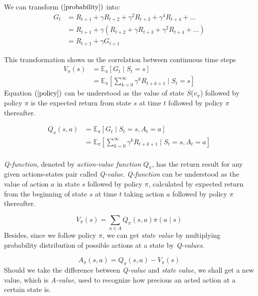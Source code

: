 \documentclass{article}
\begin{document}
We can transform $(\ref{probability})$ into:
\begin{align} 
G_t &= R_{t+1} + \gamma R_{t + 2}  + \gamma^2 R_{t + 3} + \gamma^4 R_{t + 4} + ...  \nonumber \\
    &= R_{t + 1} + \gamma (R_{t + 2} + \gamma R_{t + 3} + \gamma^2 R_{t + 4} + ...) \nonumber \\
    &= R_{t + 1} + \gamma G_{t + 1} \nonumber 
\end{align}

This transformation shows us the correlation between continuous time steps
\begin{align}
\label{policy}
V_{\pi}(s)  &= \mathbb{E}_{\pi}\left[G_{t} \mid S_{t} = s\right] \nonumber \\
            &= \mathbb{E}_{\pi}\left[\sum_{k = 0}^{\infty} \gamma^k R_{t+k+1} \mid S_t = s\right]
\end{align}
Equation $(\ref{policy})$ can be understood as the value of state $S$($v_\pi$) followed by policy $\pi$ is the expected return from state $s$ at time $t$ followed by policy $\pi$ thereafter.

\begin{align}
Q_{\pi}(s, a)   &= \mathbb{E}_{\pi}\left[G_t \mid S_t = s, A_t = a \right] \nonumber \\
                &= \mathbb{E}_{\pi}\left[\sum_{k = 0}^{\infty} \gamma^k R_{t+k+1} \mid S_t = s, A_t = a\right]
\end{align}
\\
\textit{Q-function}, denoted by \textit{action-value function} $Q_{\pi}$, has the return result for any given actions-states pair called \textit{Q-value}. \textit{Q-function} can be understood as the value of action $a$ in state $s$ followed by policy $\pi$, calculated by expected return from the beginning of state $s$ at time $t$ taking action $a$ followed by policy $\pi$ thereafter.

\begin{equation}
    V_{\pi}(s) = \sum_{a \in A} Q_{\pi}(s, a)\pi(a \mid s) \nonumber 
\end{equation}
Besides, since we follow policy $\pi$, we can get \textit{state value} by multiplying probability distribution of possible actions at a state by \textit{Q-values}.

\begin{equation}
    A_{\pi}(s, a) = Q_{\pi}(s, a) - V_{\pi}(s) \nonumber
\end{equation}
Should we take the difference between \textit{Q-value} and \textit{state value}, we shall get a new value, which is \textit{A-value}, used to recognize how precious an acted action at a certain state is.
\end{document}
